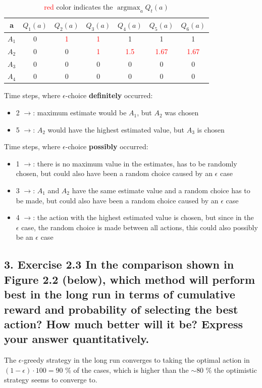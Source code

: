 \begin{center}
\begin{table}[ht]
\centering
\begin{tabular}{|c|c|c|c|c|c|c|}
\hline 
a & $Q_1(a)$ & $Q_2(a)$ & $Q_3(a)$ & $Q_4(a)$ & $Q_5(a)$ & $Q_6(a)$ \\ 
\hline 
$A_1$ & 0 & \textcolor{red}{1} & \textcolor{red}{1} & 1 & 1 & 1 \\ 
\hline 
$A_2$ & 0 & 0 & \textcolor{red}{1} & \textcolor{red}{1.5} & \textcolor{red}{1.67} & \textcolor{red}{1.67} \\ 
\hline 
$A_3$ & 0 & 0 & 0 & 0 & 0 & 0 \\ 
\hline 
$A_4$ & 0 & 0 & 0 & 0 & 0 & 0 \\ 
\hline 
\end{tabular} 
\caption{\textcolor{red}{red} color indicates the $\operatorname*{argmax}_a Q_t(a)$}
\end{table}
\end{center}
Time steps, where $\epsilon$-choice \textbf{definitely} occurred:
\begin{itemize}
\item 2 $\rightarrow$: maximum estimate would be $A_1$, but $A_2$ was chosen
\item 5 $\rightarrow$: $A_2$ would have the highest estimated value, but $A_3$ is chosen
\end{itemize}
Time steps, where $\epsilon$-choice \textbf{possibly} occurred:
\begin{itemize}
\item 1 $\rightarrow$: there is no maximum value in the estimates, has to be randomly chosen, but could also have been a random choice caused by an $\epsilon$ case	
\item 3 $\rightarrow$: $A_1$ and $A_2$ have the same estimate value and a random choice has to be made, but could also have been a random choice caused by an $\epsilon$ case
\item 4 $\rightarrow$: the action with the highest estimated value is chosen, but since in the $\epsilon$ case, the random choice is made between all actions, this could also possibly be an $\epsilon$ case
\end{itemize}
\subsection*{3. Exercise 2.3 In the comparison shown in Figure 2.2 (below), which method will perform best in the long run in terms of cumulative reward and probability of selecting the best action? How much better will it be? Express your answer quantitatively.}
The $\epsilon$-greedy strategy in the long run converges to taking the optimal action in $(1-\epsilon) \cdot 100 = 90$ \% of the cases, which is higher than the $\sim 80$ \% the optimistic strategy seems to converge to.
\newpage
